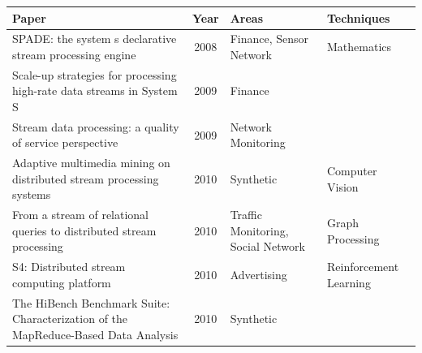 \documentclass[ppgc,diss,english]{iiufrgs}
\begin{document}
\begin{center}
	\footnotesize
	\begin{longtable}{ | p{8cm} | c | p{3cm} | p{2.5cm} |}
   		\hline
		\textbf{Paper} & \textbf{Year} & \textbf{Areas} & \textbf{Techniques} \\\hline
		
		SPADE: the system s declarative stream processing engine \cite{gedik2008spade} & 2008 & Finance, Sensor Network & Mathematics \\\hline
		Scale-up strategies for processing high-rate data streams in System S \cite{andrade2009scale} & 2009 & Finance & \\\hline
		Stream data processing: a quality of service perspective \cite{chakravarthy2009stream} & 2009 & Network Monitoring & \\\hline
		
		Adaptive multimedia mining on distributed stream processing systems \cite{turaga2010adaptive} & 2010 & Synthetic & Computer Vision \\\hline
		From a stream of relational queries to distributed stream processing \cite{zou2010stream} & 2010 & Traffic Monitoring, Social Network & Graph Processing \\\hline
		S4: Distributed stream computing platform \cite{neumeyer2010s4} & 2010 & Advertising & Reinforcement Learning \\\hline
		The HiBench Benchmark Suite: Characterization of the MapReduce-Based Data Analysis \cite{huang2010hibench} & 2010 & Synthetic & \\\hline
		

\end{longtable}
\end{center}
\end{document}
